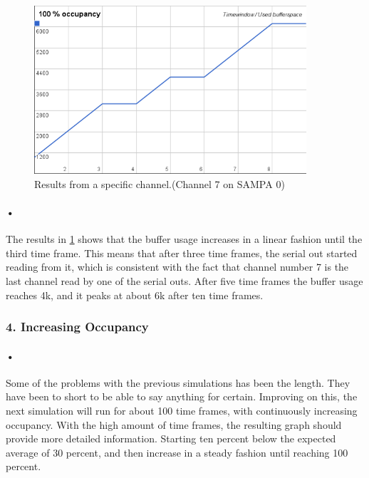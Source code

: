 \documentclass[a4paper, 12pt]{report}
\begin{document}
\begin{figure}[h!]
	\centering
		\includegraphics[width=0.9\textwidth]{images/flat-100.png}
		\caption{Results from a specific channel.(Channel 7 on SAMPA 0)}
		\label{fig:flat-100}
\end{figure}

\paragraph{•} %
The results in \ref{fig:flat-100} shows that the buffer usage increases in a linear fashion until the third time frame.
This means that after three time frames, the serial out started reading from it, which is consistent with the fact that channel number 7 is the last channel read by one of the serial outs.
After five time frames the buffer usage reaches 4k, and it peaks at about 6k after ten time frames.

\subsubsection{4. Increasing Occupancy}

\paragraph{•} %
Some of the problems with the previous simulations has been the length.
They have been to short to be able to say anything for certain.
Improving on this, the next simulation will run for about 100 time frames, with continuously increasing occupancy.
With the high amount of time frames, the resulting graph should provide more detailed information.
Starting ten percent below the expected average of 30 percent, and then increase in a steady fashion until reaching 100 percent.
\end{document}
